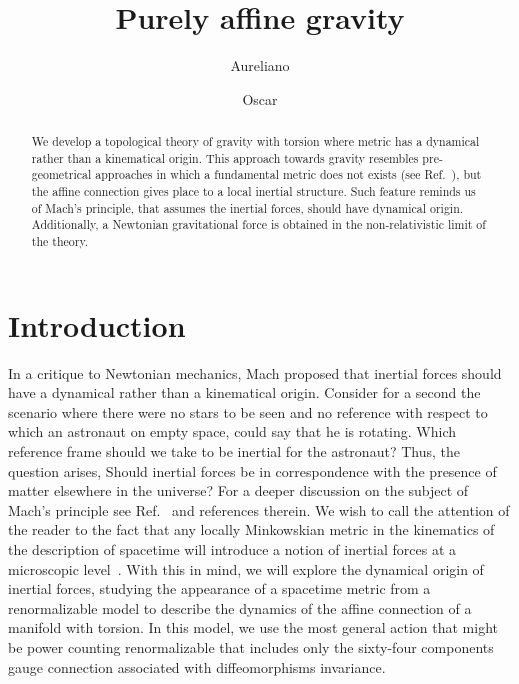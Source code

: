 \documentclass[twocolumn,aps,
  showpacs,showkeys,prd,superscriptaddress]{revtex4-1}
\begin{document}
\title{Purely affine gravity}


\author{Aureliano }

\author{Oscar }

\begin{abstract}
  We develop a topological theory of gravity with torsion where metric has a dynamical rather than a kinematical origin. This approach towards gravity resembles pre-geometrical approaches in which a fundamental metric does not exists (see Ref.~\cite{WheelerPre}), but the  affine connection gives place to a local inertial structure. Such feature reminds us of Mach's principle, that assumes the inertial forces, should have dynamical origin. Additionally, a Newtonian gravitational force is obtained in the non-relativistic limit of the theory.
\end{abstract}


\maketitle

\section{Introduction}


In a critique to Newtonian mechanics, Mach proposed that inertial forces should have a dynamical rather than a kinematical origin. Consider for a second the scenario where there were no stars to be seen and no reference with respect to which an astronaut on empty space, could say that he is rotating. Which reference frame should we take to be inertial for the astronaut?  Thus, the question arises, Should inertial forces  be in correspondence with the presence of matter elsewhere in the universe? For a deeper discussion on the subject of Mach's principle see Ref.~\cite{Lichtenegger:2004re} and references therein.  We wish to call the attention of the reader to the fact that any locally Minkowskian metric in the kinematics of the description of spacetime will introduce a notion of inertial forces at a microscopic level~\cite{Sciama:1964wt}. With this in mind, we will explore the dynamical origin of inertial forces, studying the appearance of a spacetime metric from a renormalizable model to describe the dynamics of the affine connection of a manifold with torsion. In this model, we use the most general action that might be power counting renormalizable that includes only the sixty-four components gauge connection associated with diffeomorphisms invariance.
\end{document}
